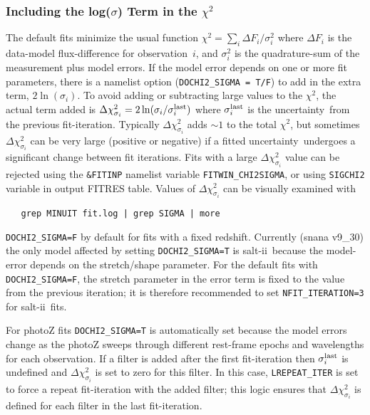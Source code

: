 \documentclass[12pt]{article}
\newcommand{\unc}{uncertainty}
\newcommand{\SALTII}{{\sc salt-ii}}
\newcommand{\obs}{observation}
\begin{document}
   \subsubsection{Including the log($\sigma$) Term in the $\chi^2$ }
   \label{sss:chi2sigma}

\newcommand{\SIGLAST}{\sigma_i^{\rm last}}
\newcommand{\SIGCHISQ}{\Delta\chi^2_{\sigma_i}}


The default fits minimize the usual function
$\chi^2 = \sum_i \Delta F_i/\sigma_i^2$ where
$\Delta F_i$ is the data-model flux-difference
for \obs\ $i$, and $\sigma_i^2$ is the quadrature-sum
of the measurement plus model errors.  If the model
error depends on one or more fit parameters,
there is a namelist option ({\tt DOCHI2\_SIGMA = T/F})
to add in the extra term, $2\ln(\sigma_i)$.
To avoid adding or subtracting large values to the 
$\chi^2$, the actual term added is 
$\SIGCHISQ = 2\ln(\sigma_i/{\SIGLAST})$ where $\SIGLAST$
is the \unc\ from the previous fit-iteration.
Typically $\SIGCHISQ$ adds $\sim 1$ to the total $\chi^2$,
but sometimes $\SIGCHISQ$ can be very large 
(positive or negative) if a fitted \unc\ undergoes
a significant change between fit iterations.
Fits with a large $\SIGCHISQ$ value can be rejected
using the {\tt \&FITINP} namelist variable {\tt FITWIN\_CHI2SIGMA},
or using {\tt SIGCHI2} variable in output FITRES table.
Values of $\SIGCHISQ$ can be visually examined with
%
\begin{verbatim}
   grep MINUIT fit.log | grep SIGMA | more
\end{verbatim}


{\tt DOCHI2\_SIGMA=F} by default for fits with
a fixed redshift. 
Currently (snana v9\_30) the only model affected by 
setting {\tt DOCHI2\_SIGMA=T} is \SALTII\ because
the model-error depends on the stretch/shape parameter.
For the default fits with {\tt DOCHI2\_SIGMA=F},
the stretch parameter in the error term is fixed 
to the value from the previous iteration; it is
therefore recommended to set {\tt NFIT\_ITERATION=3}
for \SALTII\ fits.



For photoZ fits {\tt DOCHI2\_SIGMA=T} is automatically 
set because the model errors change as the photoZ sweeps 
through different rest-frame epochs and wavelengths 
for each \obs.  
If a filter is added after the first fit-iteration
then $\SIGLAST$ is undefined and $\SIGCHISQ$ is set 
to zero for this filter.
In this case, {\tt LREPEAT\_ITER} is set to force
a repeat fit-iteration with the added filter; 
this logic ensures that $\SIGCHISQ$ is defined
for each filter in the last fit-iteration.
\end{document}
